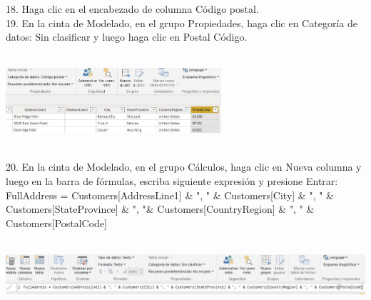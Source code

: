 \begin{flushleft}
\begin{itemize}
18. Haga clic en el encabezado de columna Código postal.\\
19. En la cinta de Modelado, en el grupo Propiedades, haga clic en Categoría de datos: Sin clasificar y luego haga clic en Postal
Código.\\
\textbf{ }\\
\begin{center}
	\includegraphics[width=8cm]{./Imagenes/image16} 
	\end{center}
\textbf{ }\\

20. En la cinta de Modelado, en el grupo Cálculos, haga clic en Nueva columna y luego en la barra de fórmulas, escriba
siguiente expresión y presione Entrar:\\ FullAddress = Customers[AddressLine1] \& ", " \& Customers[City] \& ", " \&
Customers[StateProvince] \& ", "\& Customers[CountryRegion] \& ", " \&
Customers[PostalCode]\\
\textbf{ }\\
\begin{center}
	\includegraphics[width=16cm]{./Imagenes/image17} 
	\end{center}
\textbf{ }\\


\end{itemize}
\end{flushleft}
